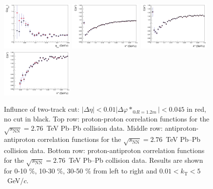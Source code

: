 \begin{figure}
  \includegraphics[width=0.32\textwidth]{cmp_dcatpconly11h_ttc_nottc_cen4/APAP}
  \includegraphics[width=0.32\textwidth]{cmp_dcatpconly11h_ttc_nottc_cen0/PAP}
  \includegraphics[width=0.32\textwidth]{cmp_dcatpconly11h_ttc_nottc_cen2/PAP}
  \includegraphics[width=0.32\textwidth]{cmp_dcatpconly11h_ttc_nottc_cen4/PAP}
  \caption{{Influnce of two-track cut: $|\Delta \eta| < 0.01  |\Delta \varphi*_{@R=1.2m}| < 0.045$ in red, no cut in black}. Top row: proton-proton correlation functions for the $\sqrt{s_{\mathrm{NN}}}=2.76$~TeV Pb--Pb collision data. Middle row: antiproton-antiproton correlation functions for the $\sqrt{s_{\mathrm{NN}}}=2.76$~TeV Pb--Pb collision data. Bottom row: proton-antiproton correlation functions for the $\sqrt{s_{\mathrm{NN}}}=2.76$~TeV Pb--Pb collision data. Results are shown for 0-10 $\%$, 10-30 $\%$,  30-50 $\%$ from left to right and $0.01 < k_{\mathrm{T}}<5$~GeV/$c$.}
  \label{cf_ttc_nottc}
\end{figure}

